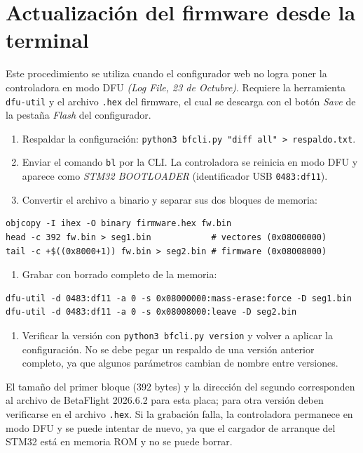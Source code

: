 \documentclass[11pt,letterpaper]{article}
\newcommand{\logref}[1]{\textit{(Log File, #1)}}
\begin{document}
\section{Actualización del firmware desde la terminal}
\label{anx:flash}
Este procedimiento se utiliza cuando el configurador web no logra poner la controladora en modo DFU \logref{23 de Octubre}. Requiere la herramienta \texttt{dfu-util} y el archivo \texttt{.hex} del firmware, el cual se descarga con el botón \textit{Save} de la pestaña \textit{Flash} del configurador.
\begin{enumerate}[nosep]
    \item Respaldar la configuración: \texttt{python3 bfcli.py "diff all" > respaldo.txt}.
    \item Enviar el comando \texttt{bl} por la CLI. La controladora se reinicia en modo DFU y aparece como \textit{STM32 BOOTLOADER} (identificador USB \texttt{0483:df11}).
    \item Convertir el archivo a binario y separar sus dos bloques de memoria:
\end{enumerate}
\begin{lstlisting}
objcopy -I ihex -O binary firmware.hex fw.bin
head -c 392 fw.bin > seg1.bin            # vectores (0x08000000)
tail -c +$((0x8000+1)) fw.bin > seg2.bin # firmware (0x08008000)
\end{lstlisting}
\begin{enumerate}
    \item Grabar con borrado completo de la memoria:
\end{enumerate}
\begin{lstlisting}
dfu-util -d 0483:df11 -a 0 -s 0x08000000:mass-erase:force -D seg1.bin
dfu-util -d 0483:df11 -a 0 -s 0x08008000:leave -D seg2.bin
\end{lstlisting}
\begin{enumerate}
    \item Verificar la versión con \texttt{python3 bfcli.py version} y volver a aplicar la configuración. No se debe pegar un respaldo de una versión anterior completo, ya que algunos parámetros cambian de nombre entre versiones.
\end{enumerate}
El tamaño del primer bloque (392 bytes) y la dirección del segundo corresponden al archivo de BetaFlight 2026.6.2 para esta placa; para otra versión deben verificarse en el archivo \texttt{.hex}. Si la grabación falla, la controladora permanece en modo DFU y se puede intentar de nuevo, ya que el cargador de arranque del STM32 está en memoria ROM y no se puede borrar.
\end{document}
